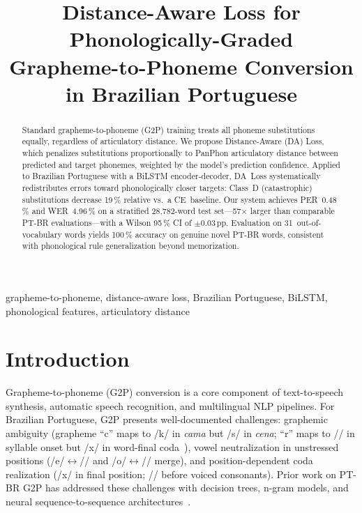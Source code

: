 \documentclass[conference]{IEEEtran}
\begin{document}

\title{Distance-Aware Loss for Phonologically-Graded\\
       Grapheme-to-Phoneme Conversion in Brazilian Portuguese}

\author{%
  \IEEEauthorblockN{[ANONYMOUS]}
  \IEEEauthorblockA{[ANONYMOUS]}
}

\maketitle

\begin{abstract}
Standard grapheme-to-phoneme (G2P) training treats all phoneme
substitutions equally, regardless of articulatory distance.
We propose Distance-Aware (DA) Loss, which penalizes substitutions
proportionally to PanPhon articulatory distance between predicted and
target phonemes, weighted by the model's prediction confidence.
Applied to Brazilian Portuguese with a BiLSTM encoder-decoder,
DA~Loss systematically redistributes errors toward phonologically
closer targets: Class~D (catastrophic) substitutions decrease
19\,\% relative vs.\ a CE~baseline.
Our system achieves PER~0.48\,\% and WER~4.96\,\% on a stratified
28{,}782-word test set---57$\times$ larger than comparable PT-BR
evaluations---with a Wilson 95\,\% CI of $\pm$0.03\,pp.
Evaluation on 31~out-of-vocabulary words yields 100\,\% accuracy
on genuine novel PT-BR words, consistent with phonological rule
generalization beyond memorization.
\end{abstract}

\begin{IEEEkeywords}
grapheme-to-phoneme, distance-aware loss, Brazilian Portuguese,
BiLSTM, phonological features, articulatory distance
\end{IEEEkeywords}

\section{Introduction}

Grapheme-to-phoneme (G2P) conversion is a core component of
text-to-speech synthesis, automatic speech recognition, and
multilingual NLP pipelines.
For Brazilian Portuguese, G2P presents well-documented challenges:
graphemic ambiguity (grapheme ``c'' maps to /k/ in \textit{cama}
but /s/ in \textit{cena}; ``r'' maps to // in syllable
onset but /x/ in word-final coda~\cite{barbosa2004brazilian}), vowel
neutralization in unstressed positions
(/e/$\leftrightarrow$// and /o/$\leftrightarrow$//
merge), and position-dependent coda realization (/x/ in final
position; // before voiced consonants).
Prior work on PT-BR G2P has addressed these challenges with
decision trees, n-gram models, and neural sequence-to-sequence
architectures~\cite{neto2006brazilian}.
\end{document}
